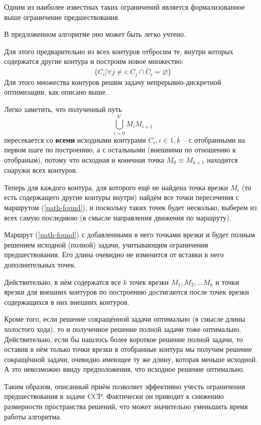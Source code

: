 \documentclass{article}
\begin{document}
Одним из наиболее известных таких
ограничений является формализованное выше
ограничение предшествования.

В предложенном алгоритме оно может быть
легко учтено.

Для этого предварительно из всех контуров отбросим
те, внутри которых содержатся другие контура и построим
новое множество:
$$
\big\{
    C_i | \forall j \ne i: C_j \cap \tilde C_i = \varnothing
\big\}
$$
Для этого множества контуров решим задачу 
непрерывно-дискретной оптимизации,
как описано выше.

Легко заметить, 
что полученный путь
\begin{equation}
    \bigcup_{i=0}^{k'} M_i M_{i+1} 
\label{path-found}
\end{equation}
пересекается со \textbf{всеми}
исходными контурами $C_i, i \in \overline{1,k}$ --
с отобранными на первом шаге по построению,
а с остальными
(внешними по отношению к отобраным),
потому что исходная и конечная точка
$M_0 \equiv M_{k+1}$
находится снаружи всех контуров.

Теперь для каждого контура,
для которого ещё не найдена точка врезки $M_i$
(то есть содержащего другие контуры внутри)
найдём все точки пересечения с маршрутом
(\ref{path-found}),
и поскольку таких точек будет несколько,
выберем из всех самую последнюю
(в смысле направления движения по маршруту).

Маршрут (\ref{path-found}) с добавленными
в него точками врезки и будет полным решением
исходной (полной) задачи,
учитывающим ограничения предшествования.
Его длина очевидно не изменится от вставки
в него дополнительных точек.

Действительно, в нём содержатся все $k$ точек врезки
$M_1, M_2, \dots M_k$
и точки врезки для внешних контуров
по построению достигаются
после точек врезки содержащихся в них внешних контуров.

Кроме того, если решение сокращённой задачи оптимально
(в смысле длины холостого хода),
то и полученное решение полной задачи тоже оптимально.
Действительно,
если бы нашлось более короткое решение полной задачи,
то оставив в нём только точки врезки в отобранные контура
мы получим решение сокращённой задачи,
очевидно имеющее ту же длину,
которая меньше исходной.
А это невозможно ввиду предположения,
что исходное решение оптимально.

Таким образом,
описанный приём позволяет
эффективно учесть ограничения
предшествования в задаче CCP.
Фактически он приводит
к снижению размерности пространства решений,
что может значительно уменьшить время работы алгоритма.
\end{document}
